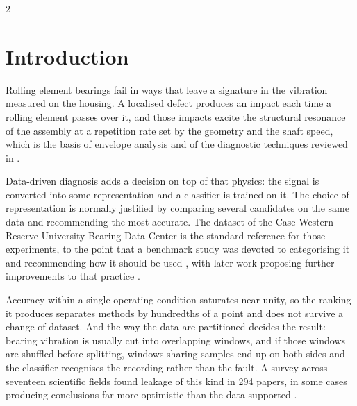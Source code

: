 \documentclass[12pt,twoside,titlepage]{ingenius}
\begin{document}
\begin{multicols}{2}
\raggedcolumns
\section{Introduction}

Rolling element bearings fail in ways that leave a signature in the vibration
measured on the housing. A localised defect produces an impact each time a
rolling element passes over it, and those impacts excite the structural
resonance of the assembly at a repetition rate set by the geometry and the shaft
speed, which is the basis of envelope analysis and of the diagnostic techniques
reviewed in \cite{randall2011}.

Data-driven diagnosis adds a decision on top of that physics: the signal is
converted into some representation and a classifier is trained on it. The choice
of representation is normally justified by comparing several candidates on the
same data and recommending the most accurate. The dataset of the Case Western
Reserve University Bearing Data Center \cite{cwru} is the standard reference for
those experiments, to the point that a benchmark study was devoted to
categorising it and recommending how it should be used \cite{smith2015}, with
later work proposing further improvements to that practice \cite{hendriks2022}.

Accuracy within a single
operating condition saturates near unity, so the ranking it produces separates
methods by hundredths of a point and does not survive a change of dataset. And
the way the data are partitioned decides the result: bearing vibration is
usually cut into overlapping windows, and if those windows are shuffled before
splitting, windows sharing samples end up on both sides and the classifier
recognises the recording rather than the fault. A survey across seventeen
scientific fields found leakage of this kind in 294 papers, in some cases
producing conclusions far more optimistic than the data supported
\cite{kapoor2023}.


\end{multicols}
\end{document}
